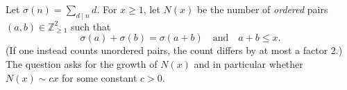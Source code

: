 Let $\sigma(n)=\sum_{d\mid n} d$. For $x\ge 1$, let $N(x)$ be the number of \emph{ordered} pairs $(a,b)\in\mathbb Z_{\ge 1}^2$ such that
\[
\sigma(a)+\sigma(b)=\sigma(a+b)\quad\text{and}\quad a+b\le x.
\]
(If one instead counts unordered pairs, the count differs by at most a factor $2$.)
The question asks for the growth of $N(x)$ and in particular whether $N(x)\sim c x$ for some constant $c>0$.
